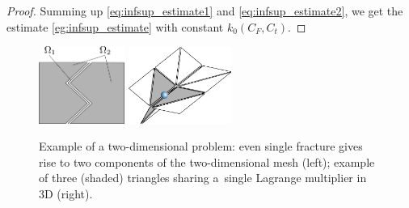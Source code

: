 \begin{proof}
Summing up \eqref{eq:infsup_estimate1} and \eqref{eq:infsup_estimate2}, we
get the estimate \eqref{eg:infsup_estimate} with constant $k_0(C_F,C_t)$.




\end{proof}


\begin{figure}[tbh]
\begin{center}
\includegraphics[width=0.25\textwidth]{figs/components} \hspace{25mm} 
\includegraphics[width=0.30\textwidth]{figs/starlike-conf}
\end{center}
\caption{\label{fig:schemes}
Example of a two-dimensional problem: even single fracture gives rise to two components of the two-dimensional mesh (left);
example of three (shaded) triangles sharing a~single Lagrange multiplier in 3D (right).}
\end{figure}






